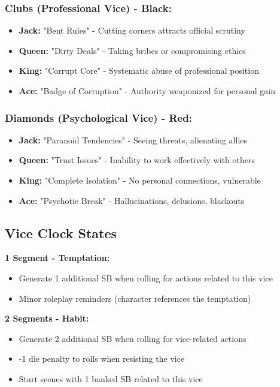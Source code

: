 \documentclass[11pt]{article}
\begin{document}
\subsubsection{Clubs (Professional Vice) - Black:}
\begin{itemize}
    \item \textbf{Jack:} "Bent Rules" - Cutting corners attracts official scrutiny
    \item \textbf{Queen:} "Dirty Deals" - Taking bribes or compromising ethics
    \item \textbf{King:} "Corrupt Core" - Systematic abuse of professional position
    \item \textbf{Ace:} "Badge of Corruption" - Authority weaponized for personal gain
\end{itemize}

\subsubsection{Diamonds (Psychological Vice) - Red:}
\begin{itemize}
    \item \textbf{Jack:} "Paranoid Tendencies" - Seeing threats, alienating allies
    \item \textbf{Queen:} "Trust Issues" - Inability to work effectively with others
    \item \textbf{King:} "Complete Isolation" - No personal connections, vulnerable
    \item \textbf{Ace:} "Psychotic Break" - Hallucinations, delusions, blackouts
\end{itemize}

\subsection{Vice Clock States}

\textbf{1 Segment - Temptation:}
\begin{itemize}
    \item Generate 1 additional SB when rolling for actions related to this vice
    \item Minor roleplay reminders (character references the temptation)
\end{itemize}

\textbf{2 Segments - Habit:}
\begin{itemize}
    \item Generate 2 additional SB when rolling for vice-related actions
    \item -1 die penalty to rolls when resisting the vice
    \item Start scenes with 1 banked SB related to this vice
\end{itemize}
\end{document}

